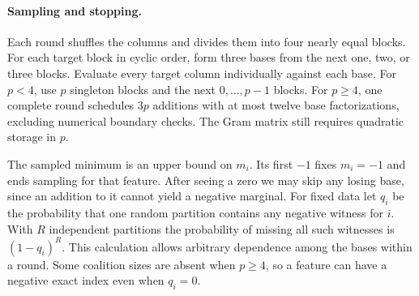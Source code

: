\paragraph{Sampling and stopping.}
Each round shuffles the columns and divides them into four nearly equal blocks.
For each target block in cyclic order, form three bases from the next one,
two, or three blocks. Evaluate every target column individually against each base.
For \(p<4\), use \(p\) singleton blocks and the next \(0,\ldots,p-1\) blocks.
For \(p\ge4\), one complete round schedules \(3p\) additions with at most twelve
base factorizations, excluding numerical boundary checks. The Gram matrix
still requires quadratic storage in \(p\).

The sampled minimum is an upper bound on \(m_i\). Its first \(-1\) fixes
\(m_i=-1\) and ends sampling for that feature. After seeing a zero we may
skip any losing base, since an addition to it cannot yield a negative
marginal. For fixed data let \(q_i\) be the probability that one random
partition contains any negative witness for \(i\). With \(R\) independent
partitions the probability of missing all such witnesses is \((1-q_i)^R\).
This calculation allows arbitrary dependence among the bases within a round.
Some coalition sizes are absent when \(p\ge4\), so a feature can have a
negative exact index even when \(q_i=0\).
